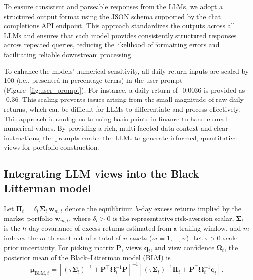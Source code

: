 To ensure consistent and parseable responses from the LLMs, we adopt a structured output format using the JSON schema supported by the chat completions API endpoint. This approach standardizes the outputs across all LLMs and ensures that each model provides consistently structured responses across repeated queries, reducing the likelihood of formatting errors and facilitating reliable downstream processing.

To enhance the models' numerical sensitivity, all daily return inputs are scaled by 100 (i.e., presented in percentage terms) in the user prompt (Figure~\ref{fig:user_prompt}). For instance, a daily return of -0.0036 is provided as -0.36. This scaling prevents issues arising from the small magnitude of raw daily returns, which can be difficult for LLMs to differentiate and process effectively. This approach is analogous to using basis points in finance to handle small numerical values. By providing a rich, multi-faceted data context and clear instructions, the prompts enable the LLMs to generate informed, quantitative views for portfolio construction.


\subsection{Integrating LLM views into the Black–Litterman model} 
Let $\boldsymbol{\Pi}_t=\delta_t\,\boldsymbol{\Sigma}_t\,\mathbf{w}_{m,t}$ denote the equilibrium $h$-day excess returns implied by the market portfolio $\mathbf{w}_{m,t}$, where $\delta_t>0$ is the representative risk‑aversion scalar, $\boldsymbol{\Sigma}_t$ is the $h$‑day covariance of excess returns estimated from a trailing window, and $m$ indexes the $m$-th asset out of a total of $n$ assets ($m=1,\ldots,n$). Let $\tau>0$ scale prior uncertainty. For picking matrix $\mathbf{P}$, views $\mathbf{q}_t$, and view confidence $\mathbf{\Omega}_t$, the posterior mean of the Black–Litterman model (BLM) is
\begin{equation} \label{eq:BlackLitterman}
    \boldsymbol{\mu}_{\text{BLM}, t}=\left[\left(\tau \boldsymbol{\Sigma}_t\right)^{-1}+\mathbf{P}^{\top} \boldsymbol{\Omega}_t^{-1} \mathbf{P}\right]^{-1}\left[\left(\tau \boldsymbol{\Sigma}_t\right)^{-1} \mathbf{\Pi}_t+\mathbf{P}^{\top} \boldsymbol{\Omega}_t^{-1} \mathbf{q}_t\right].
\end{equation}

